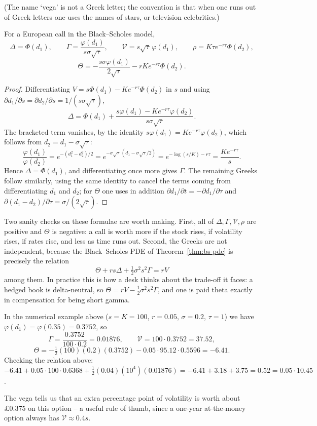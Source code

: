 (The name `vega' is not a Greek letter; the convention is that when one runs out of Greek letters one uses the names of stars, or television celebrities.)

\begin{proposition}\label{prop:greeks}
	For a European call in the Black--Scholes model,
	$$
	\Delta = \Phi(d_1), \qquad \Gamma = \frac{\varphi(d_1)}{s\sigma\sqrt\tau}, \qquad \mathcal{V} = s\sqrt\tau\,\varphi(d_1), \qquad \rho = K\tau e^{-r\tau}\Phi(d_2),
	$$
	$$
	\Theta = -\frac{s\sigma\varphi(d_1)}{2\sqrt\tau} - rKe^{-r\tau}\Phi(d_2).
	$$
\end{proposition}

\begin{proof}
	Differentiating $V = s\Phi(d_1) - Ke^{-r\tau}\Phi(d_2)$ in $s$ and using $\partial d_1/\partial s = \partial d_2/\partial s = 1/(s\sigma\sqrt\tau)$,
	$$
	\Delta = \Phi(d_1) + \frac{s\varphi(d_1) - Ke^{-r\tau}\varphi(d_2)}{s\sigma\sqrt\tau}.
	$$
	The bracketed term vanishes, by the identity $s\varphi(d_1) = Ke^{-r\tau}\varphi(d_2)$, which follows from $d_2 = d_1 - \sigma\sqrt\tau$:
	$$
	\frac{\varphi(d_1)}{\varphi(d_2)} = e^{-(d_1^2-d_2^2)/2} = e^{-\sigma\sqrt\tau\,(d_1 - \sigma\sqrt\tau/2)} = e^{-\log(s/K) - r\tau} = \frac{K e^{-r\tau}}{s}.
	$$
	Hence $\Delta = \Phi(d_1)$, and differentiating once more gives $\Gamma$. The remaining Greeks follow similarly, using the same identity to cancel the terms coming from differentiating $d_1$ and $d_2$; for $\Theta$ one uses in addition $\partial d_1/\partial t = -\partial d_1/\partial\tau$ and $\partial(d_1 - d_2)/\partial \tau = \sigma/(2\sqrt\tau)$.
\end{proof}

Two sanity checks on these formulae are worth making. First, all of $\Delta,\Gamma,\mathcal{V},\rho$ are positive and $\Theta$ is negative: a call is worth more if the stock rises, if volatility rises, if rates rise, and less as time runs out. Second, the Greeks are not independent, because the Black--Scholes PDE of Theorem~\ref{thm:bs-pde} is precisely the relation
$$
\Theta + rs\Delta + \tfrac12\sigma^2s^2\Gamma = rV
$$
among them. In practice this is how a desk thinks about the trade-off it faces: a hedged book is delta-neutral, so $\Theta = rV - \tfrac12\sigma^2s^2\Gamma$, and one is paid theta exactly in compensation for being short gamma.

\begin{example}
	In the numerical example above ($s = K = 100$, $r=0.05$, $\sigma=0.2$, $\tau=1$) we have $\varphi(d_1) = \varphi(0.35) = 0.3752$, so
	$$
	\Gamma = \frac{0.3752}{100\cdot0.2} = 0.01876, \qquad \mathcal{V} = 100\cdot 0.3752 = 37.52,
	$$
	$$
	\Theta = -\tfrac12(100)(0.2)(0.3752) - 0.05\cdot 95.12\cdot 0.5596 = -6.41.
	$$
	Checking the relation above: $-6.41 + 0.05\cdot100\cdot0.6368 + \tfrac12(0.04)(10^4)(0.01876) = -6.41+3.18+3.75 = 0.52 = 0.05\cdot 10.45$. \checkmark

	The vega tells us that an extra percentage point of volatility is worth about $\pounds 0.375$ on this option -- a useful rule of thumb, since a one-year at-the-money option always has $\mathcal{V} \approx 0.4 s$.
\end{example}

